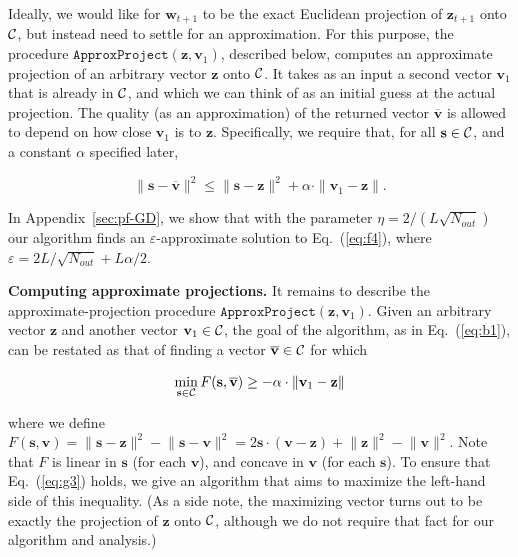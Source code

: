 Ideally, we would like for $\mathbf{w}_{t+1}$ to be the exact Euclidean projection of $\mathbf{z}_{t+1}$ onto ${\cal C}$, but instead need to settle for an approximation. For this purpose, the procedure ${\ensuremath{\mathtt{ApproxProject}}}(\mathbf{z},\mathbf{v}_1)$, described below, computes an approximate projection of an arbitrary vector $\mathbf{z}$ onto ${\cal C}$. It takes as an input a second vector $\mathbf{v}_1$ that is already in ${\cal C}$, and which we can think of as an initial guess at the actual projection. The quality (as an approximation) of the returned vector ${\overline{\mathbf{v}}}$ is allowed to depend on how close $\mathbf{v}_1$ is to $\mathbf{z}$.
Specifically, we require that, for all $\mathbf{s}\in{\cal C}$, and a constant ${\alpha}$ specified later,

\begin{equation} \label{eq:b1}
  {\|{\mathbf{s} - {\overline{\mathbf{v}}}}\|^2} \leq  {\|{\mathbf{s} - \mathbf{z}}\|^2}
            + {\alpha} \cdot \|{\mathbf{v}_1 - \mathbf{z}}\|.
\end{equation}

In Appendix~\ref{sec:pf-GD}, we show that with the parameter
    $\eta = {2}/({L\sqrt{{N_{out}}}})$
our algorithm finds an \ensuremath{\varepsilon}-approximate solution to Eq.~(\ref{eq:f4}), where
    $\varepsilon = {2L}/{\sqrt{{N_{out}}}}
               + {L {\alpha}}/{2}$.

 {\bf Computing approximate projections.} It remains to describe the approximate-projection procedure
${\ensuremath{\mathtt{ApproxProject}}}(\mathbf{z},\mathbf{v}_1)$.
Given an arbitrary vector $\mathbf{z}$ and another vector $\mathbf{v}_1\in{\cal C}$, the goal of the algorithm, as in Eq.~(\ref{eq:b1}), can be restated as that of finding a vector ${\overline{\mathbf{v}}}\in{\cal C}$ for which

\begin{equation} \label{eq:g3}
  \min_{\mathbf{s}\in{\cal C}} F(\mathbf{s},{\overline{\mathbf{v}}}) \geq - {\alpha} \cdot \|{\mathbf{v}_1 - \mathbf{z}}\|
\end{equation}

where we define
$F(\mathbf{s},\mathbf{v})
 = {\|{\mathbf{s} - \mathbf{z}}\|^2} - {\|{\mathbf{s} - \mathbf{v}}\|^2}
 = 2\mathbf{s}\cdot (\mathbf{v} - \mathbf{z}) + {\|{\mathbf{z}}\|^2} - {\|{\mathbf{v}}\|^2}$.
Note that $F$ is linear in $\mathbf{s}$ (for each $\mathbf{v}$), and concave in
$\mathbf{v}$ (for each $\mathbf{s}$).
To ensure that Eq.~(\ref{eq:g3}) holds, we give an algorithm that aims to maximize the left-hand side of this inequality. (As a side note, the maximizing vector turns out to be exactly the projection of $\mathbf{z}$ onto ${\cal C}$, although we do not require that fact for our algorithm and analysis.)

